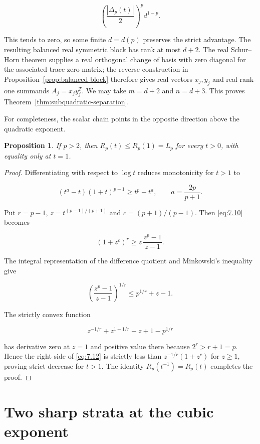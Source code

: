 \documentclass[11pt]{article}
\newtheorem{proposition}[theorem]{Proposition}
\begin{document}
\[
\left(\frac{|\Delta_p(t)|}{2}\right)^p d^{1-p}.
\tag{7.9}\label{eq:7.9}
\]

This tends to zero, so some finite $d=d(p)$ preserves the strict advantage.
The resulting balanced real symmetric block has rank at most $d+2$. The real
Schur--Horn theorem supplies a real orthogonal change of basis with zero
diagonal for the associated trace-zero matrix; the reverse construction in
Proposition~\ref{prop:balanced-block} therefore gives real vectors $x_j,y_j$ and real rank-one
summands $A_j=x_jy_j^T$. We may take $m=d+2$ and $n=d+3$. This proves
Theorem~\ref{thm:subquadratic-separation}.

For completeness, the scalar chain points in the opposite direction above the
quadratic exponent.

\begin{proposition}
\label{prop:superquadratic-chain}
If $p>2$, then $R_p(t)\le R_p(1)=L_p$ for every $t>0$,
with equality only at $t=1$.

\end{proposition}

\begin{proof}
Differentiating with respect to $\log t$ reduces monotonicity for
$t>1$ to

\[
(t^a-t)(1+t)^{p-1}\ge t^p-t^a,
\qquad a=\frac{2p}{p+1}.
\tag{7.10}\label{eq:7.10}
\]

Put $r=p-1$, $z=t^{(p-1)/(p+1)}$ and $c=(p+1)/(p-1)$. Then \eqref{eq:7.10} becomes

\[
(1+z^c)^r\ge z\,\frac{z^p-1}{z-1}.
\tag{7.11}\label{eq:7.11}
\]

The integral representation of the difference quotient and Minkowski's
inequality give

\[
\left(\frac{z^p-1}{z-1}\right)^{1/r}
\le p^{1/r}+z-1.
\tag{7.12}\label{eq:7.12}
\]

The strictly convex function

\[
z^{-1/r}+z^{1+1/r}-z+1-p^{1/r}
\tag{7.13}\label{eq:7.13}
\]

has derivative zero at $z=1$ and positive value there because
$2^r>r+1=p$. Hence the right side of \eqref{eq:7.12} is strictly less than
$z^{-1/r}(1+z^c)$ for $z\ge1$, proving strict decrease for $t>1$.
The identity $R_p(t^{-1})=R_p(t)$ completes the proof.
\end{proof}


\section{Two sharp strata at the cubic exponent}
\end{document}
